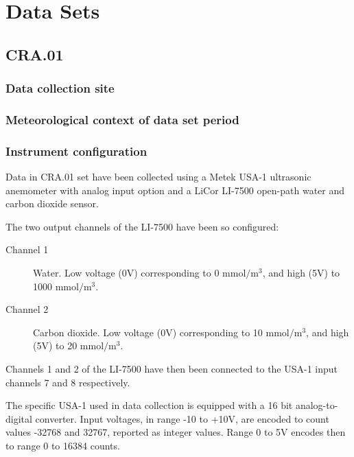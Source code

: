 \documentclass[a4paper,10pt]{book}
\begin{document}
\chapter{Data Sets}
\label{chap:Data Sets}

\section{CRA.01}
\label{sec:CRA.01}

\subsection{Data collection site}

\subsection{Meteorological context of data set period}

\subsection{Instrument configuration}
\label{sec:CRA.01 instrument configuration}

Data in CRA.01 set have been collected using a Metek USA-1 ultrasonic anemometer with analog input option and a LiCor LI-7500 open-path water and carbon dioxide sensor.

The two output channels of the LI-7500 have been so configured:

\begin{description}
 \item[Channel 1] Water. Low voltage (0V) corresponding to 0 $\mbox{mmol}/\mbox{m}^3$, and high (5V) to 1000 $\mbox{mmol}/\mbox{m}^3$.
 \item[Channel 2] Carbon dioxide. Low voltage (0V) corresponding to 10 $\mbox{mmol}/\mbox{m}^3$, and high (5V) to 20 $\mbox{mmol}/\mbox{m}^3$.
\end{description}

Channels 1 and 2 of the LI-7500 have then been connected to the USA-1 input channels 7 and 8 respectively.

The specific USA-1 used in data collection is equipped with a 16 bit analog-to-digital converter. Input voltages, in range -10 to +10V, are encoded to count values -32768 and 32767, reported as integer values. Range 0 to 5V encodes then to range 0 to 16384 counts.
\end{document}

